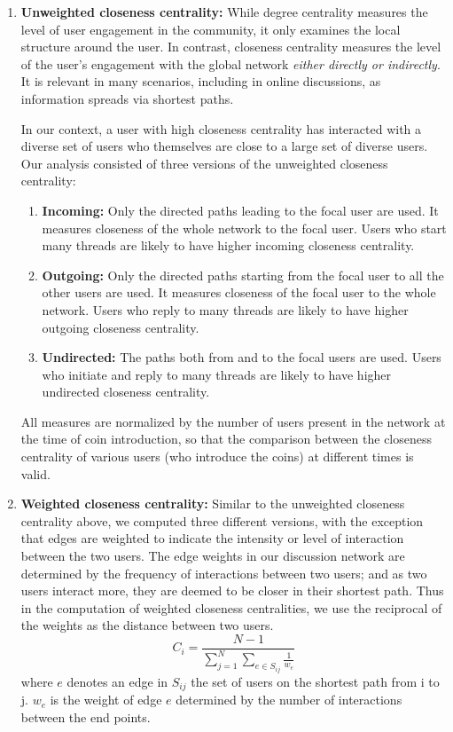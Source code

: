 \begin{enumerate}[topsep=0pt,itemsep=-0.5ex,partopsep=1ex,parsep=1ex]
  \item \textbf{Unweighted closeness centrality:} While degree centrality measures the level of user engagement in the community, it only examines the local structure around the user.  In contrast, closeness centrality measures the level of the user's engagement with the global network \textit{either directly or indirectly}. It is relevant in many scenarios, including in online discussions, as information spreads via shortest paths. 
  
  In our context, a user with high closeness centrality has interacted with a diverse set of users who themselves are close to a large set of diverse users.  Our analysis consisted of three versions of the unweighted closeness centrality:
  \begin{enumerate}
    \item \textbf{Incoming:} Only the directed paths leading to the focal user are used. It measures closeness of the whole network to the focal user. Users who start many threads are likely to have higher incoming closeness centrality.
    \item \textbf{Outgoing:} Only the directed paths starting from the focal user to all the other users are used. It measures closeness of the focal user to the whole network. Users who reply to many threads are likely to have higher outgoing closeness centrality.
    \item \textbf{Undirected:} The paths both from and to the focal users are used. Users who initiate and reply to many threads are likely to have higher undirected closeness centrality.
  \end{enumerate} 
  All measures are normalized by the number of users present in the network at the time of coin introduction, so that the comparison between the closeness centrality of various users (who introduce the coins) at different times  is valid. 
  \item \textbf{Weighted closeness centrality:} Similar to the unweighted closeness centrality above, we computed three different versions, with the exception that edges are weighted to indicate the intensity or level of interaction between the two users. The edge weights in our discussion network are determined by the frequency of interactions between two users; and as two users interact more, they are deemed to be closer in their shortest path. Thus in the computation of weighted closeness centralities, we use the reciprocal of the weights as the distance between two users.
  \begin{equation}
    C_{i} = \frac{N-1}{\sum_{j=1}^{N}\sum_{e \in S_{ij}} \frac{1}{w_{e}}}
  \end{equation}
  where $e$ denotes an edge in $S_{ij}$ the set of users on the shortest path from i to j. $w_e$ is the weight of edge $e$ determined by the number of interactions between the end points.
  

\end{enumerate}

